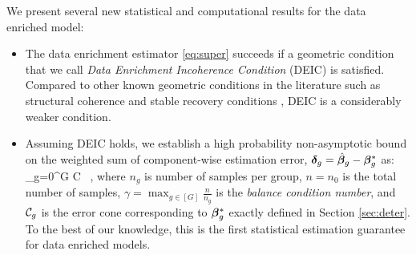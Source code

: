 We present several new statistical and computational results for the data enriched model:
\begin{itemize}[leftmargin = .4cm]
	\item The data enrichment estimator \eqref{eq:super} succeeds if a geometric condition that we call \emph{Data Enrichment Incoherence Condition} (DEIC) is satisfied. Compared to other known geometric conditions in the literature such as structural coherence \cite{guba16} and stable recovery conditions \cite{mctr13}, DEIC is a considerably weaker condition.
	\item Assuming DEIC holds, we establish a high probability non-asymptotic bound on the weighted sum of component-wise estimation error, $\boldsymbol{\delta}_g = \hat{\boldsymbol{\beta}}_g - \boldsymbol{\beta}_g^*$ as:
	{\small \be
	\label{eq:errorsum}
	\sum_{g=0}^{G}    \leq  C \gamma {}~,
	\ee}
	where $n_g$ is number of samples per group, $n = n_0$ is the total number of samples, $\gamma = \max_{g \in [G] } \frac{n}{n_g}$ is the \emph{balance condition number}, and ${\cal C}_g$ is the error cone corresponding to $\boldsymbol{\beta}_g^*$ exactly defined in Section \ref{sec:deter}.
	To the best of our knowledge, this is the first statistical estimation guarantee for data enriched models.
	

\end{itemize}
